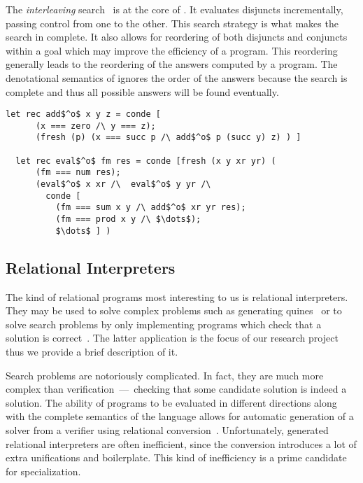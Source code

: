 The \emph{interleaving} search~\cite{10.1145/1090189.1086390} is at the core of \mk.
It evaluates disjuncts incrementally, passing control from one to the other.
This search strategy is what makes the search in \mk complete.
It also allows for reordering of both disjuncts and conjuncts within a goal which may improve the efficiency of a program.
This reordering generally leads to the reordering of the answers computed by a \mk program.
The denotational semantics of \mk ignores the order of the answers because the search is complete and thus all possible answers will be found eventually.

\begin{figure*}[!t]
  \centering
  \begin{minipage}{0.68\textwidth}
    \begin{lstlisting}[label={eval:arith}, caption={Evaluator of arithmetic expressions}, captionpos=b, frame=tb]
  let rec add$^o$ x y z = conde [
      (x === zero /\ y === z);
      (fresh (p) (x === succ p /\ add$^o$ p (succ y) z) ) ]

  let rec eval$^o$ fm res = conde [fresh (x y xr yr) (
      (fm === num res);
      (eval$^o$ x xr /\  eval$^o$ y yr /\
        conde [
          (fm === sum x y /\ add$^o$ xr yr res);
          (fm === prod x y /\ $\dots$);
          $\dots$ ] )
    \end{lstlisting}
  \end{minipage}
\end{figure*}


\subsection{Relational Interpreters}

The kind of relational programs most interesting to us is relational interpreters.
They may be used to solve complex problems such as generating quines~\cite{byrd2012minikanren} or to solve search problems by only implementing programs which check that a solution is correct~\cite{lozov2019relational}.
The latter application is the focus of our research project thus we provide a brief description of it.

Search problems are notoriously complicated.
In fact, they are much more complex than verification~---~checking that some candidate solution is indeed a solution.
The ability of \mk programs to be evaluated in different directions along with the complete semantics of the language allows for automatic generation of a solver from a verifier using relational conversion~\cite{lozov2017typed}.
Unfortunately, generated relational interpreters are often inefficient, since the conversion introduces a lot of extra unifications and boilerplate.
This kind of inefficiency is a prime candidate for specialization.

